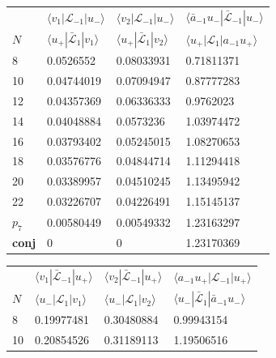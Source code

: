 \documentclass[a4paper,10pt]{article}
\begin{document}


\begin{table}[H]
\center
\begin{minipage}{0.5\linewidth}
\center
\begin{tabular}{llll}
 \vspace*{5pt}     & $\langle v_1 | {\mathcal L}_{-1} | u_- \rangle$ & $\langle v_2 | {\mathcal L}_{-1} | u_- \rangle$ & $\langle \bar{a}_{-1}u_- |\bar{\mathcal L}_{-1}| u_- \rangle$    \\
%
$N$     &$\langle u_+ |\bar{\mathcal L}_{1}| v_1 \rangle$  & $\langle u_+ |\bar{\mathcal L}_{1}| v_2 \rangle$  & $\langle u_+| {\mathcal L}_{1} | a_{-1}u_+ \rangle$    \\
\hline
8 & 0.0526552 & 0.08033931 & 0.71811371 \\
10 & 0.04744019 & 0.07094947 & 0.87777283 \\
12 & 0.04357369 & 0.06336333 & 0.9762023 \\
14 & 0.04048884 & 0.0573236 & 1.03974472 \\
16 & 0.03793402 & 0.05245015 & 1.08270653 \\
18 & 0.03576776 & 0.04844714 & 1.11294418 \\
20 & 0.03389957 & 0.04510245 & 1.13495942 \\
22 & 0.03226707 & 0.04226491 & 1.15145137 \\
$p_{7}$ & 0.00580449 & 0.00549332 & 1.23163297 \\
 \bf{conj }& 0   & 0    & 1.23170369 \\
\hline
\end{tabular}
\end{minipage}%
\begin{minipage}{0.5\linewidth}
\center
\begin{tabular}{llll}
 \vspace*{5pt}     & $\langle v_1 | \bar{\mathcal L}_{-1} | u_+ \rangle$ & $\langle v_2 | \bar{\mathcal L}_{-1} | u_+ \rangle$ & $\langle {a}_{-1}u_+ |{\mathcal L}_{-1}| u_+ \rangle$    \\
%
$N$     &$\langle u_- |{\mathcal L}_{1}| v_1 \rangle$  & $\langle u_- |{\mathcal L}_{1}| v_2 \rangle$  & $\langle u_-| \bar{\mathcal L}_{1} | \bar{a}_{-1}u_- \rangle$    \\
\hline
8 & 0.19977481 & 0.30480884 & 0.99943154 \\
10 & 0.20854526 & 0.31189113 & 1.19506516 \\

\end{tabular}
\end{minipage}
\end{table}
\end{document}
